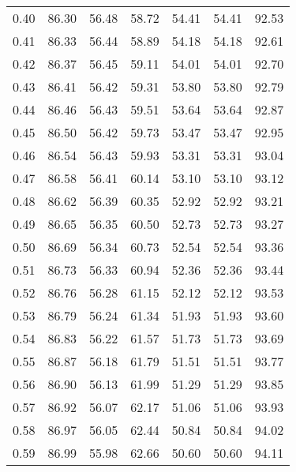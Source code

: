 \begin{tabular}{|c|c|c|c|c|c|c|}
      0.40 &     86.30 &     56.48 &      58.72 &   54.41 &      54.41 &         92.53 \\
      0.41 &     86.33 &     56.44 &      58.89 &   54.18 &      54.18 &         92.61 \\
      0.42 &     86.37 &     56.45 &      59.11 &   54.01 &      54.01 &         92.70 \\
      0.43 &     86.41 &     56.42 &      59.31 &   53.80 &      53.80 &         92.79 \\
      0.44 &     86.46 &     56.43 &      59.51 &   53.64 &      53.64 &         92.87 \\
      0.45 &     86.50 &     56.42 &      59.73 &   53.47 &      53.47 &         92.95 \\
      0.46 &     86.54 &     56.43 &      59.93 &   53.31 &      53.31 &         93.04 \\
      0.47 &     86.58 &     56.41 &      60.14 &   53.10 &      53.10 &         93.12 \\
      0.48 &     86.62 &     56.39 &      60.35 &   52.92 &      52.92 &         93.21 \\
      0.49 &     86.65 &     56.35 &      60.50 &   52.73 &      52.73 &         93.27 \\
      0.50 &     86.69 &     56.34 &      60.73 &   52.54 &      52.54 &         93.36 \\
      0.51 &     86.73 &     56.33 &      60.94 &   52.36 &      52.36 &         93.44 \\
      0.52 &     86.76 &     56.28 &      61.15 &   52.12 &      52.12 &         93.53 \\
      0.53 &     86.79 &     56.24 &      61.34 &   51.93 &      51.93 &         93.60 \\
      0.54 &     86.83 &     56.22 &      61.57 &   51.73 &      51.73 &         93.69 \\
      0.55 &     86.87 &     56.18 &      61.79 &   51.51 &      51.51 &         93.77 \\
      0.56 &     86.90 &     56.13 &      61.99 &   51.29 &      51.29 &         93.85 \\
      0.57 &     86.92 &     56.07 &      62.17 &   51.06 &      51.06 &         93.93 \\
      0.58 &     86.97 &     56.05 &      62.44 &   50.84 &      50.84 &         94.02 \\
      0.59 &     86.99 &     55.98 &      62.66 &   50.60 &      50.60 &         94.11 \\

\end{tabular}
